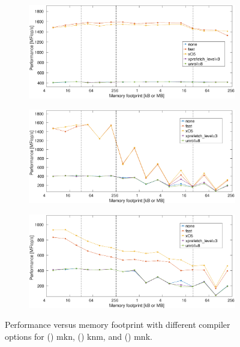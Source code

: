 \begin{figure}
\centering
\begin{subfigure}{1\textwidth}
\includegraphics[width = \textwidth]{fig/compGraph_mkn.eps}
\caption{}
\label{fig:compGraph_mkn}
\end{subfigure}

\begin{subfigure}{1\textwidth}
\includegraphics[width = \textwidth]{fig/compGraph_knm.eps}
\caption{}
\label{fig:compGraph_knm}
\end{subfigure}

\begin{subfigure}{1\textwidth}
\includegraphics[width = \textwidth]{fig/compGraph_mnk.eps}
\caption{}
\label{fig:compGraph_mnk}
\end{subfigure}
\caption{Performance versus memory footprint with different compiler options for () mkn, () knm, and () mnk.}
\label{fig:compGraph}
\end{figure}


